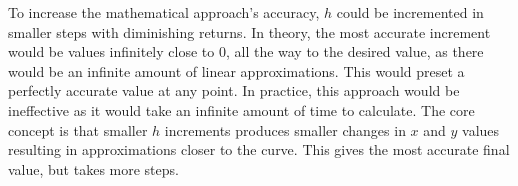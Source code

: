 \documentclass[answers,addpoints]{exam}
\begin{document}
\begin{questions}
\begin{solution}
    To increase the mathematical approach's accuracy, $h$ could be incremented in smaller steps with diminishing returns. In theory, the most accurate increment would be values infinitely close to $0$, all the way to the desired value, as there would be an infinite amount of linear approximations. This would preset a perfectly accurate value at any point. In practice, this approach would be ineffective as it would take an infinite amount of time to calculate. The core concept is that smaller $h$ increments produces smaller changes in $x$ and $y$ values resulting in approximations closer to the curve. This gives the most accurate final value, but takes more steps.

  \end{solution}


  \hrulefill


\end{questions}
\end{document}
